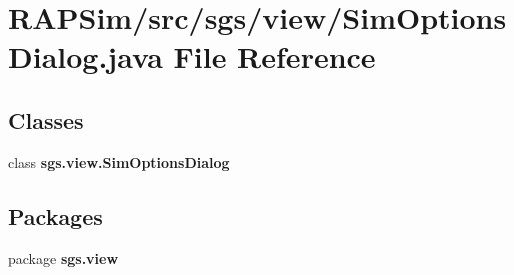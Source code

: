 \section{R\-A\-P\-Sim/src/sgs/view/\-Sim\-Options\-Dialog.java File Reference}
\label{_sim_options_dialog_8java}
\subsection*{Classes}
\begin{DoxyCompactItemize}
\item 
class {\bf sgs.\-view.\-Sim\-Options\-Dialog}
\end{DoxyCompactItemize}
\subsection*{Packages}
\begin{DoxyCompactItemize}
\item 
package {\bf sgs.\-view}
\end{DoxyCompactItemize}
